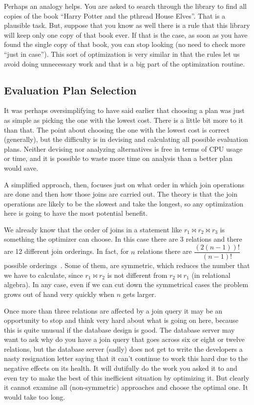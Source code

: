 Perhaps an analogy helps. You are asked to search through the library to find all copies of the book ``Harry Potter and the pthread House Elves''. That is a plausible task. But, suppose that you know as well there is a rule that this library will keep only one copy of that book ever. If that is the case, as soon as you have found the single copy of that book, you can stop looking (no need to check more ``just in case''). This sort of optimization is very similar in that the rules let us avoid doing unnecessary work and that is a big part of the optimization routine.

\subsection*{Evaluation Plan Selection}

It was perhaps oversimplifying to have said earlier that choosing a plan was just as simple as picking the one with the lowest cost. There is a little bit more to it than that. The point about choosing the one with the lowest cost is correct (generally), but the difficulty is in devising and calculating all possible evaluation plans. Neither devising nor analyzing alternatives is free in terms of CPU usage or time, and it is possible to waste more time on analysis than a better plan would save. 

A simplified approach, then, focuses just on what order in which join operations are done and then how those joins are carried out. The theory is that the join operations are likely to be the slowest and take the longest, so any optimization here is going to have the most potential benefit.

We already know that the order of joins in a statement like $r_{1} \bowtie r_{2} \bowtie r_{3}$ is something the optimizer can choose. In this case there are 3 relations and there are 12 different join orderings. In fact, for $n$ relations there are $\dfrac{(2(n-1))!}{(n-1)!}$ possible orderings~\cite{dsc}. Some of them, are symmetric, which reduces the number that we have to calculate, since $r_{1} \bowtie r_{2}$ is not different from $r_{2} \bowtie r_{1}$ (in relational algebra). In any case, even if we can cut down the symmetrical cases the problem grows out of hand very quickly when $n$ gets larger. 

Once more than three relations are affected by a join query it may be an opportunity to stop and think very hard about what is going on here, because this is quite unusual if the database design is good. The database server may want to ask why do you have a join query that goes across six or eight or twelve relations, but the database server (sadly) does not get to write the developers a nasty resignation letter saying that it can't continue to work this hard due to the negative effects on its health. It will dutifully do the work you asked it to and even try to make the best of this inefficient situation by optimizing it. But clearly it cannot examine all (non-symmetric) approaches and choose the optimal one. It would take too long.

